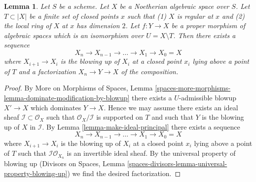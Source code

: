 \documentclass{stacks-project}
\theoremstyle{plain}
\newtheorem{lemma}[subsection]{Lemma}
\theoremstyle{definition}
\theoremstyle{remark}
\numberwithin{equation}{subsection}
\begin{document}
\begin{lemma}
\label{lemma-dominate-by-blowing-up-in-points}
Let $S$ be a scheme. Let $X$ be a Noetherian algebraic space over $S$.
Let $T \subset |X|$ be a finite set of closed points $x$ such that
(1) $X$ is regular at $x$ and (2) the local ring of $X$ at $x$ has
dimension $2$. Let $f : Y \to X$ be a proper morphism of
algebraic spaces which is an isomorphism over $U = X \setminus T$.
Then there exists a sequence
$$
X_n \to X_{n - 1} \to \ldots \to X_1 \to X_0 = X
$$
where $X_{i + 1} \to X_i$ is the blowing up of $X_i$ at a closed
point $x_i$ lying above a point of $T$ and a factorization $X_n \to Y \to X$
of the composition.
\end{lemma}

\begin{proof}
By More on Morphisms of Spaces,
Lemma \ref{spaces-more-morphisms-lemma-dominate-modification-by-blowup} 
there exists a $U$-admissible blowup $X' \to X$ which dominates
$Y \to X$. Hence we may assume there exists an ideal sheaf
$\mathcal{I} \subset \mathcal{O}_X$ such that
$\mathcal{O}_X/\mathcal{I}$ is supported on $T$ and such that
$Y$ is the blowing up of $X$ in $\mathcal{I}$.
By Lemma \ref{lemma-make-ideal-principal} 
there exists a sequence
$$
X_n \to X_{n - 1} \to \ldots \to X_1 \to X_0 = X
$$
where $X_{i + 1} \to X_i$ is the blowing up of $X_i$ at a closed
point $x_i$ lying above a point of $T$ such that
$\mathcal{I}\mathcal{O}_{X_n}$ is an invertible ideal sheaf.
By the universal property of blowing up
(Divisors on Spaces, Lemma
\ref{spaces-divisors-lemma-universal-property-blowing-up})
we find the desired factorization.
\end{proof}
\end{document}
